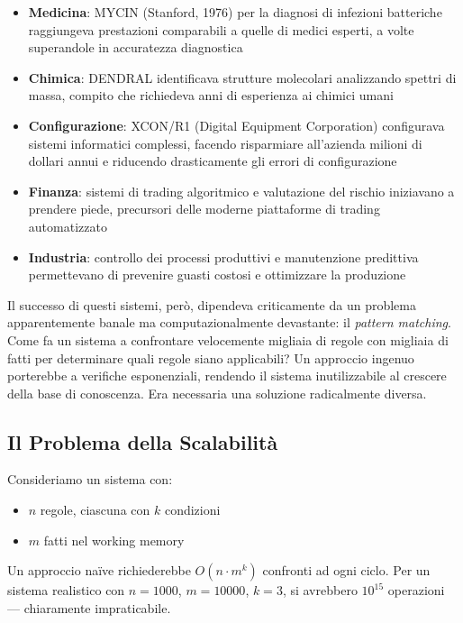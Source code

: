 \begin{itemize}
\item \textbf{Medicina}: MYCIN (Stanford, 1976) per la diagnosi di infezioni batteriche raggiungeva prestazioni comparabili a quelle di medici esperti, a volte superandole in accuratezza diagnostica
\item \textbf{Chimica}: DENDRAL identificava strutture molecolari analizzando spettri di massa, compito che richiedeva anni di esperienza ai chimici umani
\item \textbf{Configurazione}: XCON/R1 (Digital Equipment Corporation) configurava sistemi informatici complessi, facendo risparmiare all'azienda milioni di dollari annui e riducendo drasticamente gli errori di configurazione
\item \textbf{Finanza}: sistemi di trading algoritmico e valutazione del rischio iniziavano a prendere piede, precursori delle moderne piattaforme di trading automatizzato
\item \textbf{Industria}: controllo dei processi produttivi e manutenzione predittiva permettevano di prevenire guasti costosi e ottimizzare la produzione
\end{itemize}

Il successo di questi sistemi, però, dipendeva criticamente da un problema apparentemente banale ma computazionalmente devastante: il \textit{pattern matching}. Come fa un sistema a confrontare velocemente migliaia di regole con migliaia di fatti per determinare quali regole siano applicabili? Un approccio ingenuo porterebbe a verifiche esponenziali, rendendo il sistema inutilizzabile al crescere della base di conoscenza. Era necessaria una soluzione radicalmente diversa.

\subsection{Il Problema della Scalabilità}

Consideriamo un sistema con:
\begin{itemize}
\item $n$ regole, ciascuna con $k$ condizioni
\item $m$ fatti nel working memory
\end{itemize}

Un approccio naïve richiederebbe $O(n \cdot m^k)$ confronti ad ogni ciclo. Per un sistema realistico con $n=1000$, $m=10000$, $k=3$, si avrebbero $10^{15}$ operazioni --- chiaramente impraticabile.


